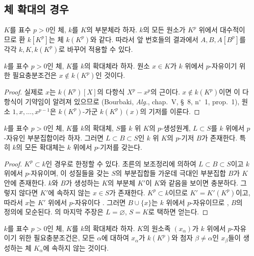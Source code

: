 \subsection{체 확대의 경우}
\label{subsection:0.21.4-ko}

\begin{env}[21.4.0]
\label{0.21.4.0-ko}
$K$를 표수 $p>0$인 체, $k$를 $K$의 부분체라 하자. $k$의 모든
원소가 $K^p$ 위에서 대수적이므로 환 $k[K^p]$는 체 $k(K^p)$와
같다. 따라서 앞 번호들의 결과에서 $A,B,A[B^p]$를 각각
$k,K,k(K^p)$로 바꾸어 적용할 수 있다.
\end{env}

\begin{lemma}[21.4.1]
\label{0.21.4.1-ko}
$k$를 표수 $p>0$인 체, $K$를 $k$의 확대체라 하자. 원소
$x\in K$가 $k$ 위에서 $p$-자유이기 위한 필요충분조건은
$x\notin k(K^p)$인 것이다.
\end{lemma}

\begin{proof}
실제로 $x$는 $k(K^p)[X]$의 다항식 $X^p-x^p$의 근이다.
$x\notin k(K^p)$이면 이 다항식이 기약임이 알려져 있으므로
(Bourbaki, \emph{Alg.}, chap.~V, §~8, n$^\circ$~1, prop.~1), 원소
$1,x,\ldots,x^{p-1}$은 $k(K^p)$-가군 $k(K^p)(x)$의 기저를 이룬다.
\end{proof}

\begin{theorem}[21.4.2]
\label{0.21.4.2-ko}
$k$를 표수 $p>0$인 체, $K$를 $k$의 확대체,
$S$를 $k$ 위 $K$의 $p$-생성원계, $L\subset S$를 $k$ 위에서
$p$-자유인 부분집합이라 하자. 그러면
$L\subset B\subset S$인 $k$ 위 $K$의 $p$-기저 $B$가 존재한다.
특히 $k$의 모든 확대체는 $k$ 위에서 $p$-기저를 갖는다.
\end{theorem}
\begin{proof}
$K^p\subset k$인 경우로 한정할 수 있다. 초른의 보조정리에 의하여
$L\subset B\subset S$이고 $k$ 위에서 $p$-자유이며, 이 성질들을
갖는 $S$의 부분집합들 가운데 극대인 부분집합 $B$가 $K$ 안에
존재한다. $k$와 $B$가 생성하는 $K$의 부분체 $K'$이 $K$와 같음을
보이면 충분하다. 그렇지 않다면 $K'$에 속하지 않는 $x\in S$가
존재한다. $K^p\subset k$이므로 $K'=K'(K^p)$이고, 따라서 $x$는
$K'$ 위에서 $p$-자유이다 . 그러면
$B\cup\{x\}$는 $k$ 위에서 $p$-자유이므로
, $B$의 정의에 모순된다. 의
마지막 주장은 $L=\varnothing$, $S=K$로 택하면 얻는다.
\end{proof}

\begin{corollary}[21.4.3]
\label{0.21.4.3-ko}
$k$를 표수 $p>0$인 체, $K$를 $k$의 확대체라 하자. $K$의 원소족
$(x_\alpha)$가 $k$ 위에서 $p$-자유이기 위한 필요충분조건은, 모든
$\alpha$에 대하여 $x_\alpha$가 $k(K^p)$와 첨자
$\beta\neq\alpha$인 $x_\beta$들이 생성하는 체 $K_\alpha$에 속하지
않는 것이다.
\end{corollary}

